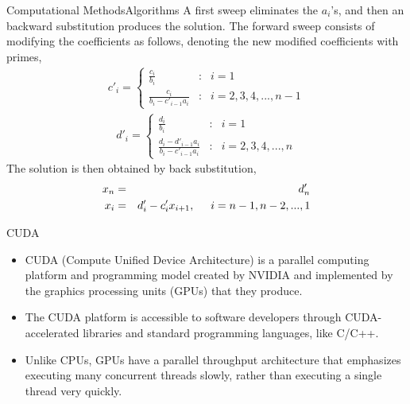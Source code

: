 \documentclass[11pt]{beamer}
\begin{document}
\begin{frame}{Computational Methods}{Algorithms}
A first sweep eliminates the $a_{i}$'s, and then an backward substitution produces the solution. The forward sweep consists of modifying the coefficients as follows, denoting the new modified coefficients with primes,
\begin{eqnarray}
c'_{i} = \left\{\begin{matrix}
\frac{c_{i}}{b_{i}} & : & i=1\\ 
\frac{c_{i}}{b_{i}-c'_{i-1}a_{i}} & : & i=2,3,4,...,n-1
\end{matrix}\right.
\end{eqnarray}
\begin{eqnarray}
d'_{i} = \left\{\begin{matrix}
\frac{d_{i}}{b_{i}} & : & i=1\\ 
\frac{d_{i}-d'_{i-1}a_{i}}{b_{i}-c'_{i-1}a_{i}} & : & i=2,3,4,...,n
\end{matrix}\right.
\end{eqnarray}
The solution is then obtained by back substitution,
\begin{eqnarray}
x_{n} &=& d'_{n}  \\
x_{i} &=& d'_{i} - c'_{i}x_{i+1}, \hspace{5 mm} i = n-1,n-2,...,1
\end{eqnarray}

\end{frame}


\begin{frame}{CUDA}
\begin{itemize}
\item CUDA (Compute Unified Device Architecture) is a parallel computing platform and programming model created by NVIDIA and implemented by the graphics processing units (GPUs) that they produce.
\item The CUDA platform is accessible to software developers through CUDA-accelerated libraries and standard programming languages, like C/C++.
\item Unlike CPUs, GPUs have a parallel throughput architecture that emphasizes executing many concurrent threads slowly, rather than executing a single thread very quickly.
\end{itemize}
\end{frame}
\end{document}
